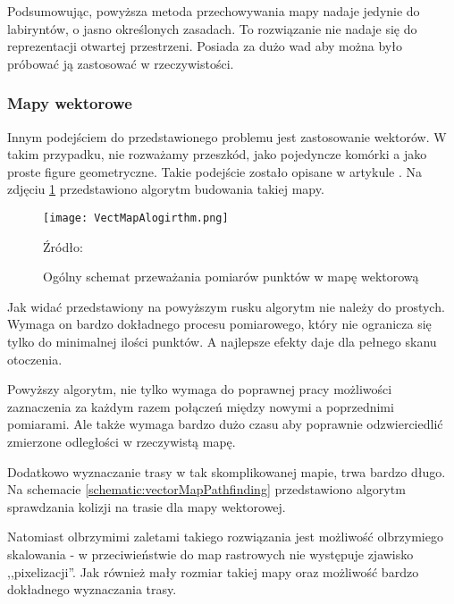             Podsumowując, powyższa metoda przechowywania mapy nadaje jedynie do labiryntów, o jasno określonych zasadach.
            To rozwiązanie nie nadaje się do reprezentacji otwartej przestrzeni.
            Posiada za dużo wad aby można było próbować ją zastosować w rzeczywistości.

        \subsubsection{Mapy wektorowe}
            Innym podejściem do przedstawionego problemu jest zastosowanie wektorów.
            W takim przypadku, nie rozważamy przeszkód, jako pojedyncze komórki a jako proste figure geometryczne.
            Takie podejście zostało opisane w artykule \cite{vector_map}.
            Na zdjęciu \ref{fig:buildVectMap} przedstawiono algorytm budowania takiej mapy.

            \begin{figure}[!ht]
                \centering
                \texttt{[image: VectMapAlogirthm.png]}
                \caption{Ogólny schemat przeważania pomiarów punktów w mapę wektorową}
                Źródło: \cite{vector_map}
                \label{fig:buildVectMap}
            \end{figure}

            Jak widać przedstawiony na powyższym rusku algorytm nie należy do prostych.
            Wymaga on bardzo dokładnego procesu pomiarowego, który nie ogranicza się tylko do minimalnej ilości punktów.
            A najlepsze efekty daje dla pełnego skanu otoczenia.

            Powyższy algorytm, nie tylko wymaga do poprawnej pracy możliwości zaznaczenia za każdym razem połączeń między nowymi a poprzednimi pomiarami.
            Ale także wymaga bardzo dużo czasu aby poprawnie odzwierciedlić zmierzone odległości w rzeczywistą mapę.

            Dodatkowo wyznaczanie trasy w tak skomplikowanej mapie, trwa bardzo długo.
            Na schemacie \ref{schematic:vectorMapPathfinding} przedstawiono algorytm sprawdzania kolizji na trasie dla mapy wektorowej.

            

            Natomiast olbrzymimi zaletami takiego rozwiązania jest możliwość olbrzymiego skalowania - w przeciwieństwie do map rastrowych nie występuje zjawisko ,,pixelizacji''.
            Jak również mały rozmiar takiej mapy oraz możliwość bardzo dokładnego wyznaczania trasy.


